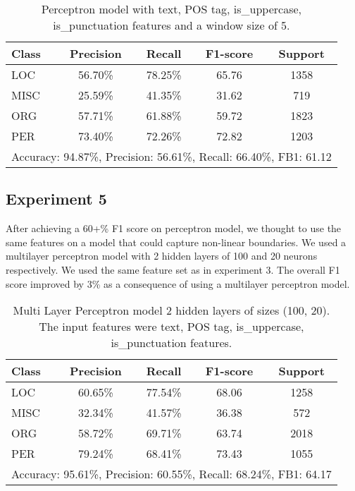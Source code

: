 \documentclass[12pt]{report}
\begin{document}
\begin{table}[h]
	\centering
	\label{tab:exp4}
	\begin{tabular}{lcccc}
		\hline
		\textbf{Class} & \textbf{Precision} & \textbf{Recall} & \textbf{F1-score} & \textbf{Support} \\ \hline
		LOC            & 56.70\%            & 78.25\%         & 65.76             & 1358             \\ \hline
		MISC           & 25.59\%            & 41.35\%         & 31.62             & 719              \\ \hline
		ORG            & 57.71\%            & 61.88\%         & 59.72             & 1823             \\ \hline
		PER            & 73.40\%            & 72.26\%         & 72.82             & 1203             \\ \hline
		\hline
		\multicolumn{5}{c}{Accuracy: 94.87\%, Precision: 56.61\%, Recall: 66.40\%, FB1: 61.12}       \\ \hline
	\end{tabular}
	\caption{Perceptron model with text, POS tag, is\_uppercase, is\_punctuation features and a window size of 5.}
\end{table}

\subsection*{Experiment 5}

After achieving a 60+\% F1 score on perceptron model, we thought to use the same features on a model that could capture non-linear boundaries. We used a multilayer perceptron model with 2 hidden layers of 100 and 20 neurons respectively. We used the same feature set as in experiment 3. The overall F1 score improved by 3\% as a consequence of using a multilayer perceptron model.

\begin{table}[h]
	\centering
	\label{tab:exp5}

	\begin{tabular}{lcccc}
		\hline
		\textbf{Class} & \textbf{Precision} & \textbf{Recall} & \textbf{F1-score} & \textbf{Support} \\ \hline
		LOC            & 60.65\%            & 77.54\%         & 68.06             & 1258             \\ \hline
		MISC           & 32.34\%            & 41.57\%         & 36.38             & 572              \\ \hline
		ORG            & 58.72\%            & 69.71\%         & 63.74             & 2018             \\ \hline
		PER            & 79.24\%            & 68.41\%         & 73.43             & 1055             \\ \hline

		\hline
		\multicolumn{5}{c}{Accuracy: 95.61\%, Precision: 60.55\%, Recall: 68.24\%, FB1: 64.17}       \\ \hline
	\end{tabular}
	\caption{Multi Layer Perceptron model 2 hidden layers of sizes (100, 20). The input features were text, POS tag, is\_uppercase, is\_punctuation features.}
\end{table}
\end{document}
